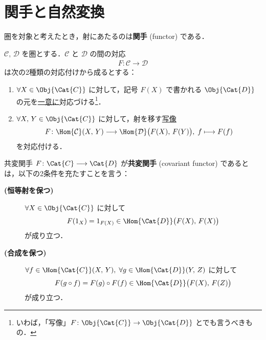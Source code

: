 \documentclass[algtopo_main]{subfiles}
\begin{document}
\section{関手と自然変換}

圏を対象と考えたとき，射にあたるのは\textbf{関手} (functor) である．

$\mathcal{C},\, \mathcal{D}$ を圏とする．$\mathcal{C}$ と $\mathcal{D}$ の間の対応
\begin{align}
    F \colon \mathcal{C} \longrightarrow \mathcal{D}
\end{align}
は次の2種類の対応付けから成るとする：
\begin{enumerate}
    \item $\forall X \in \Obj{\Cat{C}}$ に対して，記号 $F(X)$ で書かれる $\Obj{\Cat{D}}$ の元を\underline{一意に}対応づける\footnote{いわば，「写像」$F \colon \Obj{\Cat{C}} \to \Obj{\Cat{D}}$ とでも言うべきもの．}．
    \item $\forall X,\, Y \in \Obj{\Cat{C}}$ に対して，射を移す\underline{写像}
    \begin{align}
        F \colon \Hom{\mathcal{C}}(X,\, Y) \longrightarrow \Hom{\mathcal{D}} \bigl( F(X),\, F(Y) \bigr),\; f \longmapsto F(f)
    \end{align}
    を対応付ける．
\end{enumerate}

\begin{mydef}[label=def:covariant]{共変関手}
    $F \colon \Cat{C} \longrightarrow \Cat{D}$ が\textbf{共変関手} (covariant functor) であるとは，以下の2条件を充たすことを言う：
    \begin{description}
        \item[\textbf{(恒等射を保つ)}]
        
        $\forall X \in \Obj{\Cat{C}}$ に対して
        \begin{align}
            F(1_X) = 1_{F(X)} \in \Hom{\Cat{D}} \bigl( F(X),\, F(X) \bigr) 
        \end{align}
        が成り立つ．
        \item[\textbf{(合成を保つ)}]

        $\forall f \in \Hom{\Cat{C}}(X,\, Y),\; \forall g \in \Hom{\Cat{D}}(Y,\, Z)$ に対して
        \begin{align}
            F(g \circ f) = F(g) \circ F(f) \in \Hom{\Cat{D}}\bigl( F(X),\, F(Z) \bigr) 
        \end{align}
        が成り立つ．
    \end{description}
\end{mydef}
\end{document}
